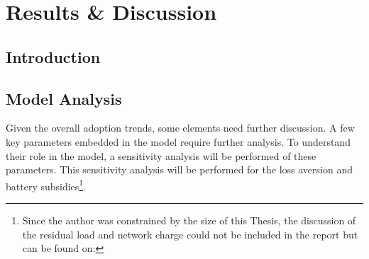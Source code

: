 \chapter{Results \& Discussion}
\section{Introduction}

\section{Model Analysis} \label{analysis}
Given the overall adoption trends, some elements need further discussion. A few key parameters embedded in the model require further analysis. To understand their role in the model, a sensitivity analysis will be performed of these parameters. This sensitivity analysis will be performed for the loss aversion and battery subsidies\footnote{Since the author was constrained by the size of this Thesis, the discussion of the residual load and network charge could not be included in the report but can be found on: }.
